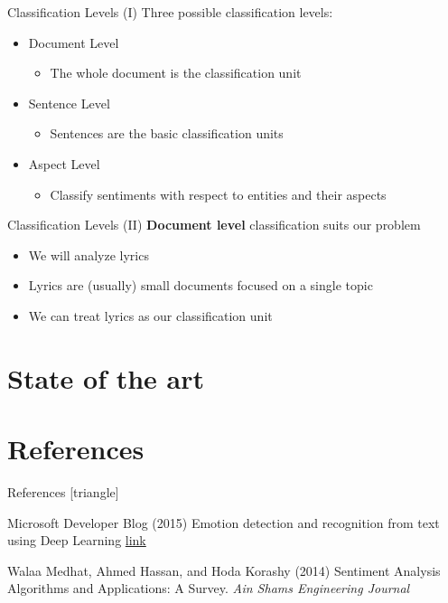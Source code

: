 \documentclass[xcolor=dvipsnames]{beamer}
\begin{document}
\begin{frame}{Classification Levels (I)}
Three possible classification levels:
\begin{itemize}
\item Document Level 
\begin{itemize}
\item The whole document is the classification unit
\end{itemize}
\item Sentence Level
\begin{itemize}
\item Sentences are the basic classification units
\end{itemize}
\item Aspect Level
\begin{itemize}
\item Classify sentiments with respect to entities and their aspects
\end{itemize}
\end{itemize}
\end{frame}

\begin{frame}{Classification Levels (II)}
\textbf{Document level} classification suits our problem
\begin{itemize}
\item We will analyze lyrics
\item Lyrics are (usually) small documents focused on a single topic
\item We can treat lyrics as our classification unit
\end{itemize}
\end{frame}

\section{State of the art}


\section{References}
\begin{frame}{References}
[triangle]
 \begin{thebibliography}{99} %
 Microsoft Developer Blog (2015)
\newblock Emotion detection and recognition from text using Deep Learning
\newblock \href{https://www.microsoft.com/developerblog/2015/11/29/emotion-detection-and-recognition-from-text-using-deep-learning/}{link}

 Walaa Medhat, Ahmed Hassan, and Hoda Korashy (2014)
\newblock Sentiment Analysis Algorithms and Applications: A Survey.
\newblock \emph{Ain Shams Engineering Journal}

\end{thebibliography}

\end{frame}
\end{document}
